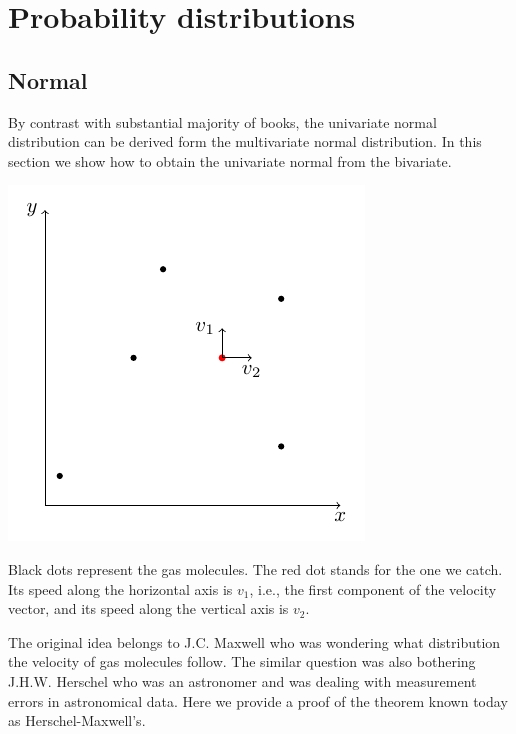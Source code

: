 \section{Probability distributions}

\subsection{Normal}

By contrast with substantial majority of books, the univariate normal distribution
can be derived form the multivariate normal distribution.
In this section we show how to obtain the univariate normal from the bivariate.

\begin{marginfigure}
  \includegraphics[width=\linewidth]{figures/04_normal.pdf}
  \caption{Black dots represent the gas molecules.
  The red dot stands for the one we catch.
  Its speed along the horizontal axis is $v_1$, i.e., the first component of
  the velocity vector, and its speed along the vertical axis is $v_2$.}
\end{marginfigure}

The original idea belongs to J.C. Maxwell who was wondering
what distribution the velocity of gas molecules follow.
The similar question was also bothering J.H.W. Herschel who was an astronomer
and was dealing with measurement errors in astronomical data.
Here we provide a proof of the theorem known today as Herschel-Maxwell's.

